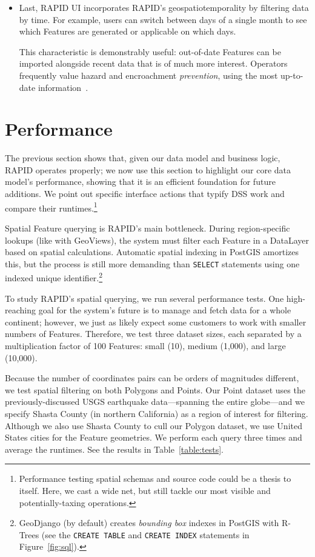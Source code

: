 \begin{itemize}
\item Last, RAPID UI incorporates RAPID's geospatiotemporality by filtering data by time. For example, users can switch between days of a single month to see which Features are generated or applicable on which days.

This characteristic is demonstrably useful: out-of-date Features can be imported alongside recent data that is of much more interest. Operators frequently value hazard and encroachment \textit{prevention}, using the most up-to-date information~\cite{Dunning2013}.
\end{itemize}

\section{Performance}
The previous section shows that, given our data model and business logic, RAPID operates properly; we now use this section to highlight our core data model's performance, showing that it is an efficient foundation for future additions. We point out specific interface actions that typify DSS work and compare their runtimes.\footnote{Performance testing spatial schemas and source code could be a thesis to itself. Here, we cast a wide net, but still tackle our most visible and potentially-taxing operations.}

Spatial Feature querying is RAPID's main bottleneck. During region-specific lookups (like with GeoViews), the system must filter each Feature in a DataLayer based on spatial calculations. Automatic spatial indexing in PostGIS amortizes this, but the process is still more demanding than \texttt{SELECT} statements using one indexed unique identifier.\footnote{GeoDjango (by default) creates \textit{bounding box} indexes in PostGIS with R-Trees (see the \texttt{CREATE TABLE} and \texttt{CREATE INDEX} statements in Figure~\ref{fig:sql}).}

To study RAPID's spatial querying, we run several performance tests. One high-reaching goal for the system's future is to manage and fetch data for a whole continent; however, we just as likely expect some customers to work with smaller numbers of Features. Therefore, we test three dataset sizes, each separated by a multiplication factor of 100 Features: small (10), medium (1,000), and large (10,000).

Because the number of coordinates pairs can be orders of magnitudes different, we test spatial filtering on both Polygons and Points. Our Point dataset uses the previously-discussed USGS earthquake data---spanning the entire globe---and we specify Shasta County (in northern California) as a region of interest for filtering. Although we also use Shasta County to cull our Polygon dataset, we use United States cities for the Feature geometries. We perform each query three times and average the runtimes. See the results in Table~\ref{table:tests}.

